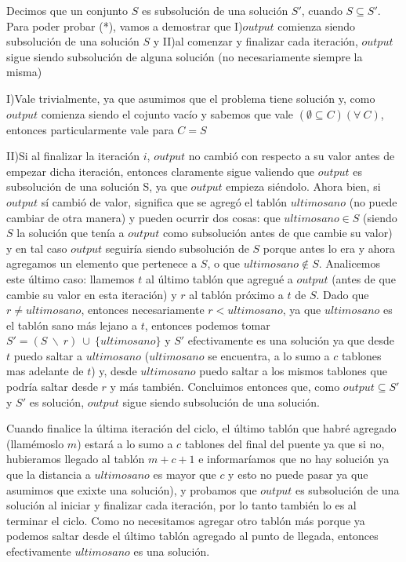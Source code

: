 \documentclass{article}
\begin{document}
\vspace{0.5cm}\noindent Decimos que un conjunto $S$ es subsoluci\'on de una soluci\'on $S'$, cuando $S \subseteq S'$.
\newline Para poder probar (*), vamos a demostrar que I)$output$ comienza siendo subsoluci\'on de una soluci\'on $S$ y II)al comenzar y finalizar cada iteraci\'on, $output$ sigue siendo subsoluci\'on de alguna soluci\'on (no necesariamente siempre la misma)

\vspace{0.3cm}\noindent I)Vale trivialmente, ya que asumimos que el problema tiene soluci\'on y, como $output$ comienza siendo el cojunto vac\'io y sabemos que vale $(\emptyset \subseteq C)(\forall \ C)$, entonces particularmente vale para $C = S$

\vspace{0.4cm}\noindent II)Si al finalizar la iteraci\'on $i$, $output$ no cambi\'o con respecto a su valor antes de empezar dicha iteraci\'on, entonces claramente sigue valiendo que $output$ es subsoluci\'on de una soluci\'on S, ya que $output$ empieza si\'endolo. \newline Ahora bien, si $output$ s\'i cambi\'o de valor, significa que se agreg\'o el tabl\'on $ultimosano$ (no puede cambiar de otra manera) y pueden ocurrir dos cosas: que $ultimosano \in S$ (siendo $S$ la soluci\'on que ten\'ia a $output$ como subsoluci\'on antes de que cambie su valor) y en tal caso $output$ seguir\'ia siendo subsoluci\'on de $S$ porque antes lo era y ahora agregamos un elemento que pertenece a $S$, o que $ultimosano \notin S$. Analicemos este \'ultimo caso: llamemos $t$ al \'ultimo tabl\'on que agregu\'e a $output$ (antes de que cambie su valor en esta iteraci\'on) y $r$ al tabl\'on pr\'oximo a $t$ de $S$. Dado que $r \neq ultimosano$, entonces necesariamente $r < ultimosano$, ya que $ultimosano$ es el tabl\'on sano m\'as lejano a $t$, entonces podemos tomar $S' = (S \ \backslash \ r) \ \cup \ \{ultimosano\}$ y $S'$ efectivamente es una soluci\'on ya que desde $t$ puedo saltar a $ultimosano$ ($ultimosano$ se encuentra, a lo sumo a $c$ tablones mas adelante de $t$) y, desde $ultimosano$ puedo saltar a los mismos tablones que podr\'ia saltar desde $r$ y m\'as tambi\'en. Concluimos entonces que, como $output \subseteq S'$ y $S'$ es soluci\'on, $output$ sigue siendo subsoluci\'on de una soluci\'on.

\vspace{0.4cm}\noindent Cuando finalice la \'ultima iteraci\'on del ciclo, el \'ultimo tabl\'on que habr\'e agregado (llam\'emoslo $m$) estar\'a a lo sumo a $c$ tablones del final del puente ya que si no, hubieramos llegado al tabl\'on $m + c + 1$ e informar\'iamos que no hay soluci\'on ya que la distancia a $ultimosano$ es mayor que $c$ y esto no puede pasar ya que asumimos que exixte una soluci\'on), y probamos que $output$ es subsoluci\'on de una soluci\'on al iniciar y finalizar cada iteraci\'on, por lo tanto tambi\'en lo es al terminar el ciclo. Como no necesitamos agregar otro tabl\'on m\'as porque ya podemos saltar desde el \'ultimo tabl\'on agregado al punto de llegada, entonces efectivamente $ultimosano$ es una soluci\'on.
\end{document}
